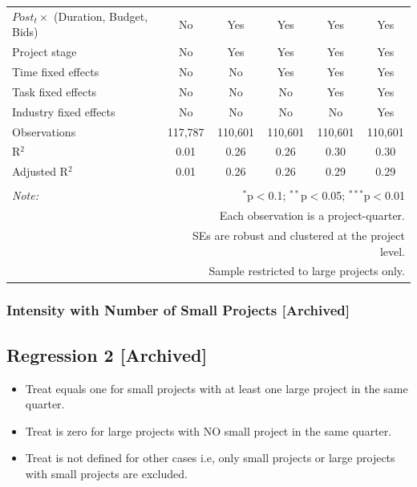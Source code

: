 \documentclass[
]{article}
\providecommand{\tightlist}{%
  \setlength{\itemsep}{0pt}\setlength{\parskip}{0pt}}
\begin{document}
\begin{table}[H]
\begin{tabular}{@{\extracolsep{-10pt}}lccccc}
$Post_t \times $  (Duration, Budget, Bids) & No & Yes & Yes & Yes & Yes \\ 
Project stage & No & Yes & Yes & Yes & Yes \\ 
Time fixed effects & No & No & Yes & Yes & Yes \\ 
Task fixed effects & No & No & No & Yes & Yes \\ 
Industry fixed effects & No & No & No & No & Yes \\ 
Observations & 117,787 & 110,601 & 110,601 & 110,601 & 110,601 \\ 
R$^{2}$ & 0.01 & 0.26 & 0.26 & 0.30 & 0.30 \\ 
Adjusted R$^{2}$ & 0.01 & 0.26 & 0.26 & 0.29 & 0.29 \\ 
\hline 
\hline \\[-1.8ex] 
\textit{Note:}  & \multicolumn{5}{r}{$^{*}$p$<$0.1; $^{**}$p$<$0.05; $^{***}$p$<$0.01} \\ 
 & \multicolumn{5}{r}{Each observation is a project-quarter.} \\ 
 & \multicolumn{5}{r}{SEs are robust and clustered at the project level.} \\ 
 & \multicolumn{5}{r}{Sample restricted to large projects only.} \\ 
\end{tabular} 
\end{table}

\hypertarget{intensity-with-number-of-small-projects-archived}{%
\subsubsection{Intensity with Number of Small Projects
{[}Archived{]}}\label{intensity-with-number-of-small-projects-archived}}

\hypertarget{regression-2-archived}{%
\subsection{Regression 2 {[}Archived{]}}\label{regression-2-archived}}

\begin{itemize}
\tightlist
\item
  Treat equals one for small projects with at least one large project in
  the same quarter.
\item
  Treat is zero for large projects with NO small project in the same
  quarter.
\item
  Treat is not defined for other cases i.e, only small projects or large
  projects with small projects are excluded.
\end{itemize}
\end{document}
